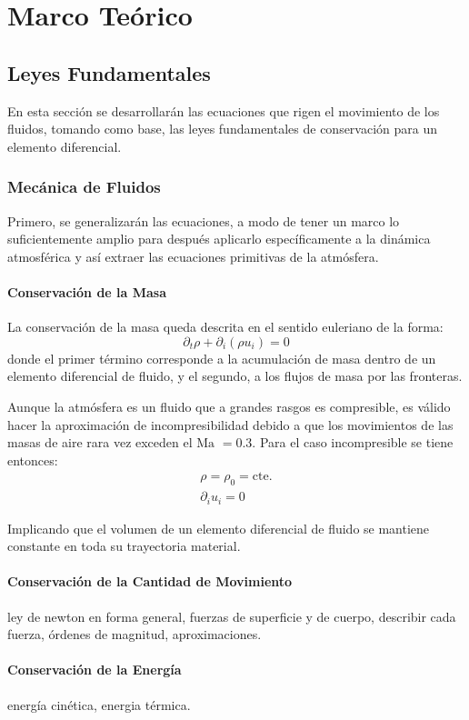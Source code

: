 \chapter{Marco Teórico}
\section{Leyes Fundamentales}
En esta sección se desarrollarán las ecuaciones que rigen el movimiento de los fluidos, tomando como base, las leyes fundamentales de conservación para un elemento diferencial.
\subsection{Mecánica de Fluidos}
Primero, se generalizarán las ecuaciones, a modo de tener un marco lo suficientemente amplio para después aplicarlo específicamente a la dinámica atmosférica y así extraer las ecuaciones primitivas de la atmósfera.
\subsubsection{Conservación de la Masa}
La conservación de la masa queda descrita en el sentido euleriano de la forma:
\begin{equation}
\partial_t \rho + \partial_i(\rho u_i) = 0
\end{equation}
donde el primer término corresponde a la acumulación de masa dentro de un elemento diferencial de fluido, y el segundo, a los flujos de masa por las fronteras.

Aunque la atmósfera es un fluido que a grandes rasgos es compresible, es válido hacer la aproximación de incompresibilidad debido a que los movimientos de las masas de aire rara vez exceden el $\text{Ma }=0.3$. Para el caso incompresible se tiene entonces:
\begin{eqnarray}
\rho = \rho_0 = \text{cte.} \\
\partial_i u_i =0
\end{eqnarray}

Implicando que el volumen de un elemento diferencial de fluido se mantiene constante en toda su trayectoria material.
\subsubsection{Conservación de la Cantidad de Movimiento}
ley de newton en forma general, fuerzas de superficie y de cuerpo, describir cada fuerza, órdenes de magnitud, aproximaciones.
\subsubsection{Conservación de la Energía}
energía cinética, energia térmica.

